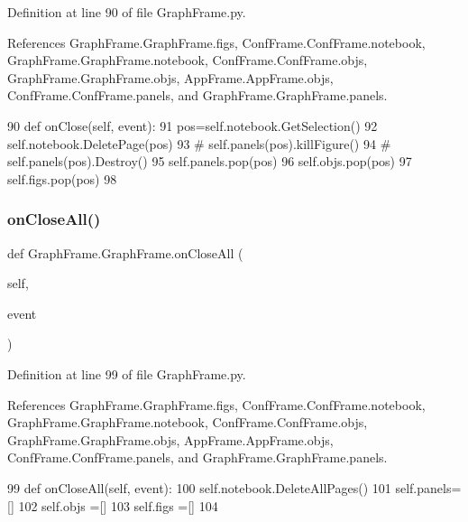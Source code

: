 Definition at line 90 of file Graph\+Frame.\+py.



References Graph\+Frame.\+Graph\+Frame.\+figs, Conf\+Frame.\+Conf\+Frame.\+notebook, Graph\+Frame.\+Graph\+Frame.\+notebook, Conf\+Frame.\+Conf\+Frame.\+objs, Graph\+Frame.\+Graph\+Frame.\+objs, App\+Frame.\+App\+Frame.\+objs, Conf\+Frame.\+Conf\+Frame.\+panels, and Graph\+Frame.\+Graph\+Frame.\+panels.


\begin{DoxyCode}
90     \textcolor{keyword}{def }onClose(self, event):
91         pos=self.notebook.GetSelection()
92         self.notebook.DeletePage(pos)
93 \textcolor{comment}{#        self.panels(pos).killFigure()}
94 \textcolor{comment}{#        self.panels(pos).Destroy()}
95         self.panels.pop(pos)
96         self.objs.pop(pos)
97         self.figs.pop(pos)
98 
\end{DoxyCode}
\mbox{\label{classGraphFrame_1_1GraphFrame_af96c612fe973abb68cd576b3e4637a31}} 
\subsubsection{\texorpdfstring{on\+Close\+All()}{onCloseAll()}}
{\footnotesize\ttfamily def Graph\+Frame.\+Graph\+Frame.\+on\+Close\+All (\begin{DoxyParamCaption}\item[{}]{self,  }\item[{}]{event }\end{DoxyParamCaption})}



Definition at line 99 of file Graph\+Frame.\+py.



References Graph\+Frame.\+Graph\+Frame.\+figs, Conf\+Frame.\+Conf\+Frame.\+notebook, Graph\+Frame.\+Graph\+Frame.\+notebook, Conf\+Frame.\+Conf\+Frame.\+objs, Graph\+Frame.\+Graph\+Frame.\+objs, App\+Frame.\+App\+Frame.\+objs, Conf\+Frame.\+Conf\+Frame.\+panels, and Graph\+Frame.\+Graph\+Frame.\+panels.


\begin{DoxyCode}
99     \textcolor{keyword}{def }onCloseAll(self, event):
100         self.notebook.DeleteAllPages()
101         self.panels=[]
102         self.objs  =[]
103         self.figs  =[]
104         
\end{DoxyCode}
\mbox{\label{classGraphFrame_1_1GraphFrame_aae122b48f5b9f830f883192c8dbab6b2}} 
